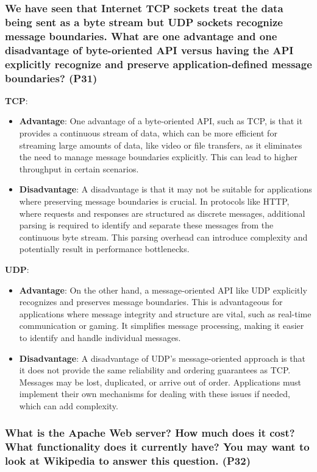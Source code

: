 \subsubsection{We have seen that Internet TCP sockets treat the data being sent as a byte stream but UDP sockets recognize message boundaries. What are one advantage and one disadvantage of byte-oriented API versus having the API explicitly recognize and preserve application-defined message boundaries? (P31)}
\textbf{TCP}:
\begin{itemize}
    \item \textbf{Advantage}: One advantage of a byte-oriented API, such as TCP, is that it provides a continuous stream of data, which can be more efficient for streaming large amounts of data, like video or file transfers, as it eliminates the need to manage message boundaries explicitly. This can lead to higher throughput in certain scenarios.
    \item \textbf{Disadvantage}: A disadvantage is that it may not be suitable for applications where preserving message boundaries is crucial. In protocols like HTTP, where requests and responses are structured as discrete messages, additional parsing is required to identify and separate these messages from the continuous byte stream. This parsing overhead can introduce complexity and potentially result in performance bottlenecks.
\end{itemize}
\textbf{UDP}:
\begin{itemize}
    \item \textbf{Advantage}: On the other hand, a message-oriented API like UDP explicitly recognizes and preserves message boundaries. This is advantageous for applications where message integrity and structure are vital, such as real-time communication or gaming. It simplifies message processing, making it easier to identify and handle individual messages.
    \item \textbf{Disadvantage}: A disadvantage of UDP's message-oriented approach is that it does not provide the same reliability and ordering guarantees as TCP. Messages may be lost, duplicated, or arrive out of order. Applications must implement their own mechanisms for dealing with these issues if needed, which can add complexity.
\end{itemize}



\subsubsection{What is the Apache Web server? How much does it cost? What functionality does it currently have? You may want to look at Wikipedia to answer this question. (P32)}

